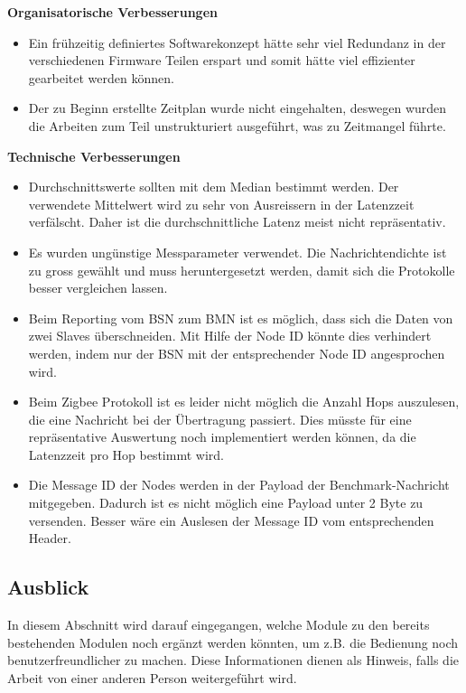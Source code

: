 \textbf{Organisatorische Verbesserungen}
\begin{itemize}
	\item Ein frühzeitig definiertes Softwarekonzept hätte sehr viel Redundanz in der verschiedenen Firmware Teilen erspart und somit hätte viel effizienter gearbeitet werden können.
	\item Der zu Beginn erstellte Zeitplan wurde nicht eingehalten, deswegen wurden die Arbeiten zum Teil unstrukturiert ausgeführt, was zu Zeitmangel führte. 
\end{itemize}

\textbf{Technische Verbesserungen}
\begin{itemize}
	\item Durchschnittswerte sollten mit dem Median bestimmt werden. Der verwendete Mittelwert wird zu sehr von Ausreissern in der Latenzzeit verfälscht. Daher ist die durchschnittliche Latenz meist nicht repräsentativ.
	\item Es wurden ungünstige Messparameter verwendet. Die Nachrichtendichte ist zu gross gewählt und muss heruntergesetzt werden, damit sich die Protokolle besser vergleichen lassen.
	\item Beim Reporting vom BSN zum BMN ist es möglich, dass sich die Daten von zwei Slaves überschneiden. Mit Hilfe der Node ID könnte dies verhindert werden, indem nur der BSN mit der entsprechender Node ID angesprochen wird.
	\item Beim Zigbee Protokoll ist es leider nicht möglich die Anzahl Hops auszulesen, die eine Nachricht bei der Übertragung passiert. Dies müsste für eine repräsentative Auswertung noch implementiert werden können, da die Latenzzeit pro Hop bestimmt wird.
	\item Die Message ID der Nodes werden in der Payload der Benchmark-Nachricht mitgegeben. Dadurch ist es nicht möglich eine Payload unter 2 Byte zu versenden. Besser wäre ein Auslesen der Message ID vom entsprechenden Header.
\end{itemize}

\newpage
\subsection{Ausblick}\label{subsec:Ausblick}
In diesem Abschnitt wird darauf eingegangen, welche Module zu den bereits bestehenden Modulen noch ergänzt werden könnten, um z.B. die Bedienung noch benutzerfreundlicher zu machen. Diese Informationen dienen als Hinweis, falls die Arbeit von einer anderen Person weitergeführt wird.

